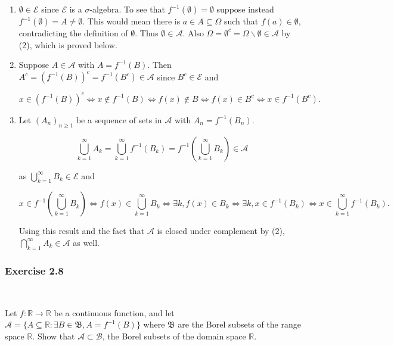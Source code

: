 \documentclass{article}
\begin{document}
\begin{enumerate}

\item $\emptyset \in \mathcal{E}$ since $\mathcal{E}$ is a $\sigma$-algebra. To see that $f^{-1}(\emptyset) = \emptyset$ suppose instead $f^{-1}(\emptyset) = A \neq \emptyset$. This would mean there is $a \in A\subseteq \Omega$ such that $f(a) \in \emptyset$, contradicting the definition of $\emptyset$. Thus $\emptyset \in \mathcal{A}$. Also $\Omega = \emptyset^c = \Omega \backslash \emptyset \in \mathcal{A}$ by (2), which is proved below. 

\item Suppose $A \in \mathcal{A}$ with $A = f^{-1}(B)$. Then $A^c = (f^{-1}(B))^c = f^{-1}(B^c) \in \mathcal{A}$ since $B^c \in \mathcal{E}$ and 

$$
x \in (f^{-1}(B))^c \iff x \notin f^{-1}(B) \iff f(x) \notin B \iff f(x) \in B^c \iff x \in f^{-1}(B^c).
$$


\item Let $(A_n)_{n\geq 1}$ be a sequence of sets in $\mathcal{A}$ with $A_n = f^{-1}(B_n)$.

$$\bigcup_{k=1}^\infty A_k = \bigcup_{k=1}^\infty f^{-1}(B_k) = f^{-1}\left(\bigcup_{k=1}^\infty  B_k \right) \in \mathcal{A}
$$

as $\bigcup_{k=1}^\infty B_k \in \mathcal{E}$ and 

$$x \in f^{-1}\left(\bigcup_{k=1}^\infty  B_k \right)
\iff f(x) \in \bigcup_{k=1}^\infty  B_k
\iff \exists k, f(x) \in B_k
\iff \exists k, x \in f^{-1}(B_k)
\iff x \in \bigcup_{k=1}^\infty  f^{-1}(B_k).
$$

Using this result and the fact that $\mathcal{A}$ is closed under complement by (2), $\bigcap_{k=1}^\infty A_k \in \mathcal{A}$ as well. 
\end{enumerate}

\subsubsection*{Exercise 2.8}\

Let $f: \mathbb{R} \rightarrow \mathbb{R}$ be a continuous function, and let $\mathcal{A} = \{A \subseteq \mathbb{R} : \exists B \in \mathfrak{B}, A = f^{-1}(B)\}$ where $\mathfrak{B}$ are the Borel subsets of the range space $\mathbb{R}$. Show that $\mathcal{A}\subset \mathcal{B}$, the Borel subsets of the domain space $\mathbb{R}$. \\
\end{document}

